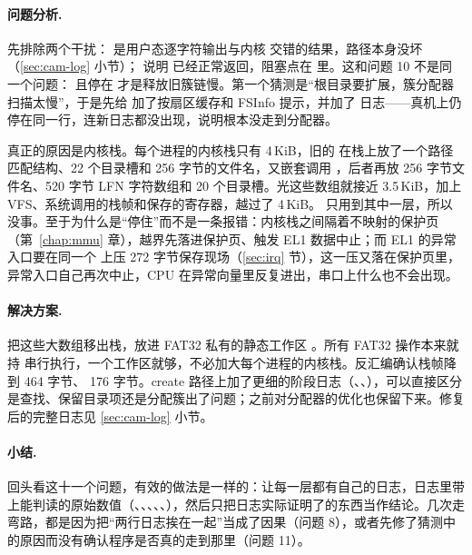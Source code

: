 \paragraph{问题分析.} 先排除两个干扰： 是用户态逐字符输出与内核  交错的结果，路径本身没坏（\ref{sec:cam-log} 小节）； 说明  已经正常返回，阻塞点在  里。这和问题 10 不是同一个问题： 且停在  才是释放旧簇链慢。第一个猜测是“根目录要扩展，簇分配器扫描太慢”，于是先给  加了按扇区缓存和 FSInfo 提示，并加了  日志——真机上仍停在同一行，连新日志都没出现，说明根本没走到分配器。

真正的原因是内核栈。每个进程的内核栈只有 4\,KiB，旧的  在栈上放了一个路径匹配结构、22 个目录槽和 256 字节的文件名，又嵌套调用 ，后者再放 256 字节文件名、520 字节 LFN 字符数组和 20 个目录槽。光这些数组就接近 3.5\,KiB，加上 VFS、系统调用的栈帧和保存的寄存器，越过了 4\,KiB。 只用到其中一层，所以没事。至于为什么是“停住”而不是一条报错：内核栈之间隔着不映射的保护页（第~\ref{chap:mmu} 章），越界先落进保护页、触发 EL1 数据中止；而 EL1 的异常入口要在同一个  上压 272 字节保存现场（\ref{sec:irq} 节），这一压又落在保护页里，异常入口自己再次中止，CPU 在异常向量里反复进出，串口上什么也不会出现。

\paragraph{解决方案.} 把这些大数组移出栈，放进 FAT32 私有的静态工作区 。所有 FAT32 操作本来就持  串行执行，一个工作区就够，不必加大每个进程的内核栈。反汇编确认栈帧降到  464 字节、 176 字节。create 路径上加了更细的阶段日志（、、），可以直接区分是查找、保留目录项还是分配簇出了问题；之前对分配器的优化也保留下来。修复后的完整日志见 \ref{sec:cam-log} 小节。

\paragraph{小结.} 回头看这十一个问题，有效的做法是一样的：让每一层都有自己的日志，日志里带上能判读的原始数值（、、、、、），然后只把日志实际证明了的东西当作结论。几次走弯路，都是因为把“两行日志挨在一起”当成了因果（问题 8），或者先修了猜测中的原因而没有确认程序是否真的走到那里（问题 11）。

